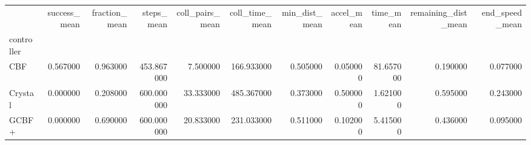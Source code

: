 \begin{tabular}{lrrrrrrrrrr}
\toprule
 & success_mean & fraction_mean & steps_mean & coll_pairs_mean & coll_time_mean & min_dist_mean & accel_mean & time_mean & remaining_dist_mean & end_speed_mean \\
controller &  &  &  &  &  &  &  &  &  &  \\
\midrule
CBF & 0.567000 & 0.963000 & 453.867000 & 7.500000 & 166.933000 & 0.505000 & 0.050000 & 81.657000 & 0.190000 & 0.077000 \\
Crystal & 0.000000 & 0.208000 & 600.000000 & 33.333000 & 485.367000 & 0.373000 & 0.500000 & 1.621000 & 0.595000 & 0.243000 \\
GCBF+ & 0.000000 & 0.690000 & 600.000000 & 20.833000 & 231.033000 & 0.511000 & 0.102000 & 5.415000 & 0.436000 & 0.095000 \\
\bottomrule
\end{tabular}
